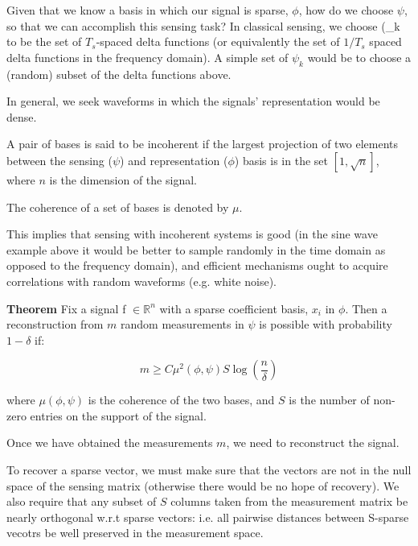 

Given that we know a basis in which our signal is sparse, \(\phi\), how do we choose \(\psi\), so that we can accomplish this sensing task? In classical sensing, we choose (\psi_k\) to be the set of \(T_s\)-spaced delta functions (or equivalently the set of \(1/T_s\) spaced delta functions in the frequency domain). A simple set of \(\psi_k\) would be to choose a (random) subset of the delta functions above.

In general, we seek waveforms in which the signals' representation would be dense.

\begin{defn}
A pair of bases is said to be incoherent if the largest projection of two elements between the sensing (\(\psi\)) and representation (\(\phi\)) basis  is in the set \( [1 , \sqrt{n}] \), where \( n \) is the dimension of the signal. 
\end{defn}

The coherence of a set of bases is denoted by \(\mu\).

This implies that sensing with incoherent systems is good (in the sine wave example above it would be better to sample randomly in the time domain as opposed to the frequency domain), and efficient mechanisms ought to acquire correlations with random waveforms (e.g. white noise).

\textbf{Theorem} \cite{Candes2006}
Fix a signal f \(\in \mathbb{R}^n\) with a sparse coefficient basis, \(x_{i}\) in \(\phi\). Then a reconstruction from \(m\) random measurements in \(\psi\) is possible with probability \(1 - \delta\) if: 

\begin{equation}
m \geq C \mu^2(\phi, \psi) S \log\left(\frac{n}{\delta}\right)
\end{equation}
\label{minsamples}

where \( \mu(\phi, \psi)\) is the coherence of the two bases, and \(S\) is the number of non-zero entries on the support of the signal.

Once we have obtained the measurements \(m\), we need to reconstruct the signal. 

To recover a sparse vector, we must make sure that the vectors are not in the null space of the sensing matrix (otherwise there would be no hope of recovery). We also require that any subset of \(S\) columns taken from the measurement matrix be nearly orthogonal w.r.t sparse vectors: i.e. all pairwise distances between S-sparse vecotrs be well preserved in the measurement space.

